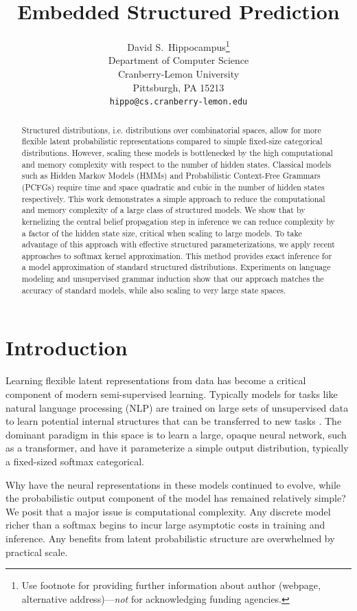 \documentclass{article}
\title{Embedded Structured Prediction}
\author{%
  David S.~Hippocampus\thanks{Use footnote for providing further information
    about author (webpage, alternative address)---\emph{not} for acknowledging
    funding agencies.} \\
  Department of Computer Science\\
  Cranberry-Lemon University\\
  Pittsburgh, PA 15213 \\
  \texttt{hippo@cs.cranberry-lemon.edu} \\
}
\begin{document}
\maketitle

\begin{abstract}
  Structured distributions, i.e. distributions over combinatorial
  spaces, allow for more flexible latent probabilistic representations
  compared to simple fixed-size categorical distributions. However,
  scaling these models is bottlenecked by the high computational and
  memory complexity with respect to the number of hidden states.  Classical models
  such as Hidden Markov Models (HMMs) and Probabilistic Context-Free
  Grammars (PCFGs) require time and space quadratic and cubic in the
  number of hidden states respectively.  This work demonstrates a
  simple approach to reduce the computational and memory complexity of
  a large class of structured models. We show that by kernelizing the
  central belief propagation step in inference we can reduce
  complexity by a factor of the hidden state size, critical when scaling to
  large models. To take advantage of this approach with effective
  structured parameterizations, we apply recent approaches to softmax
  kernel approximation. This method provides exact inference for a
  model approximation of standard structured distributions.
  Experiments on language modeling and unsupervised grammar induction
  show that our approach matches the accuracy of standard models, 
  while also scaling to very large state spaces.
\end{abstract}


\section{Introduction}


Learning flexible latent representations from data has become a
critical component of modern semi-supervised learning. Typically
models for tasks like natural language processing (NLP) are trained on
large sets of unsupervised data to learn potential internal structures
that can be transferred to new tasks \citep{devlin2018bert,radford2019language,liu2019roberta}. The dominant paradigm in this
space is to learn a large, opaque neural network, such as a
transformer, and have it parameterize a simple output distribution,
typically a fixed-sized softmax categorical.

Why have the neural representations in these models continued to evolve, while the probabilistic output component of the model has remained relatively
simple? We posit that a major issue is computational complexity.  Any
discrete model richer than a softmax begins to incur large asymptotic
costs in training and inference. Any benefits from latent probabilistic
structure are overwhelmed by practical scale.
\end{document}
